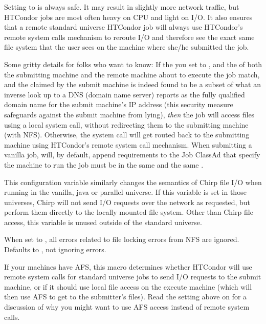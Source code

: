 \begin{description}
  Setting  to  is always safe.  It may result
  in slightly more network traffic, but HTCondor jobs are most often heavy
  on CPU and light on I/O.  It also ensures that a remote
  standard universe HTCondor job will always use HTCondor's remote system
  calls mechanism to reroute I/O and therefore see the exact same
  file system that the user sees on the machine where she/he submitted
  the job.
  
  Some gritty details for folks who want to know: If the you set
   to , and the  of
  both the submitting machine and the remote machine about to execute
  the job match, and the  claimed by the
  submit machine is indeed found to be a subset of what an inverse
  look up to a DNS (domain name server) reports as the fully qualified
  domain name for the submit machine's IP address (this security
  measure safeguards against the submit machine from lying),
  \emph{then} the job will access files using a local system call,
  without redirecting them to the submitting machine (with
  NFS).  Otherwise, the system call will get routed back to the
  submitting machine using HTCondor's remote system call mechanism.
  \Note When submitting a vanilla job,  will, by default,
  append requirements to the Job ClassAd that specify the machine to run
  the job must be in the same  and the same
  .

  This configuration variable similarly changes the semantics of Chirp file I/O
  when running in the vanilla, java or parallel universe.  
  If this variable is set in those universes, Chirp will not send I/O requests 
  over the network as requested, 
  but perform them directly to the locally mounted file system.  
  Other than Chirp file access, this variable is unused
  outside of the standard universe.

\label{param:IgnoreNFSLockErrors}
\item[\Macro{IGNORE\_NFS\_LOCK\_ERRORS}]
  When set to , all errors related to file locking errors from
  NFS are ignored.
  Defaults to , not ignoring errors.
  
\label{param:UseAfs}
\item[\Macro{USE\_AFS}]
  If your machines have AFS,
  this macro determines whether HTCondor will use remote system calls for
  standard universe jobs to send I/O requests to the submit machine,
  or if it should use local file access on the execute machine (which
  will then use AFS to get to the submitter's files).  Read the
  setting above on  for a discussion of why you might
  want to use AFS access instead of remote system calls.
  

\end{description}
